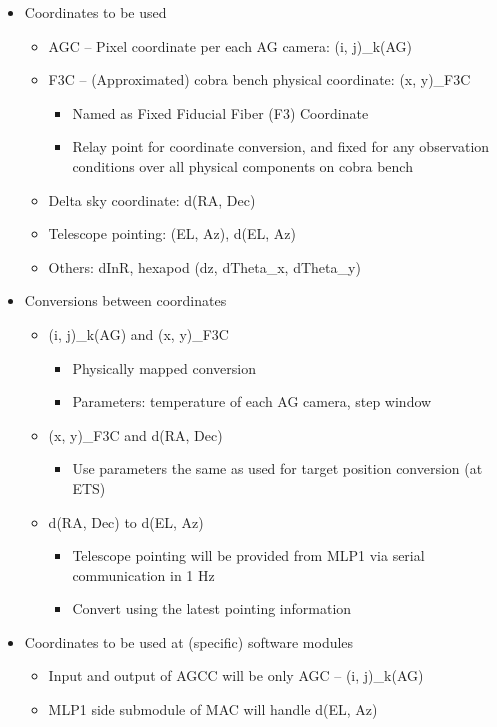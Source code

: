 \documentclass[a4paper,notitlepage]{article}
\begin{document}
\begin{itemize}
  \item Coordinates to be used
  \begin{itemize}
    \item AGC -- Pixel coordinate per each AG camera: (i, j)\_k(AG)
    \item F3C -- (Approximated) cobra bench physical coordinate: (x, y)\_F3C
    \begin{itemize}
      \item Named as Fixed Fiducial Fiber (F3) Coordinate
      \item Relay point for coordinate conversion, and fixed for any observation conditions over all physical components on cobra bench
    \end{itemize}
    \item Delta sky coordinate: d(RA, Dec)
    \item Telescope pointing: (EL, Az), d(EL, Az)
    \item Others: dInR, hexapod (dz, dTheta\_x, dTheta\_y)
  \end{itemize}
  \item Conversions between coordinates
  \begin{itemize}
    \item (i, j)\_k(AG) and (x, y)\_F3C
    \begin{itemize}
      \item Physically mapped conversion
      \item Parameters: temperature of each AG camera, step window
    \end{itemize}
    \item (x, y)\_F3C and d(RA, Dec)
    \begin{itemize}
      \item Use parameters the same as used for target position conversion (at ETS)
    \end{itemize}
    \item d(RA, Dec) to d(EL, Az)
    \begin{itemize}
      \item Telescope pointing will be provided from MLP1 via serial communication in 1 Hz
      \item Convert using the latest pointing information
    \end{itemize}
  \end{itemize}
  \item Coordinates to be used at (specific) software modules
  \begin{itemize}
    \item Input and output of AGCC will be only AGC -- (i, j)\_k(AG)
    \item MLP1 side submodule of MAC will handle d(EL, Az)
  \end{itemize}
\end{itemize}
\end{document}
